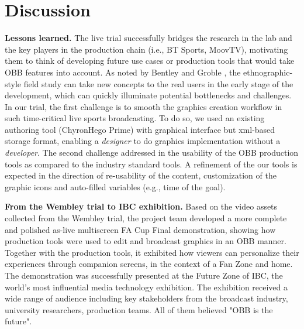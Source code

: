 \documentclass[sigchi-a, authorversion]{acmart}
\begin{document}
\section{Discussion}

\textbf{Lessons learned.} The live trial successfully bridges the research in
the lab and the key players in the production chain (i.e., BT Sports, MoovTV),
motivating them to think of developing future use cases or production tools that
would take OBB features into account. As noted by Bentley and Groble \cite{bentley2009},
the ethnographic-style field study can take new concepts to the real users in
the early stage of the development, which can quickly illuminate potential
bottlenecks and challenges. In our trial, the first challenge is to smooth the
graphics creation workflow in such time-critical live sports broadcasting. To
do so, we used an existing authoring tool (ChyronHego Prime) with graphical
interface but xml-based storage format, enabling a \textit{designer} to do
graphics implementation without a \textit{developer}. The second challenge
addressed in the usability of the OBB production tools as compared to the
industry standard tools. A refinement of the our tools is expected in the
direction of re-usability of the content, customization of the graphic icons and
auto-filled variables (e.g., time of the goal).

\textbf{From the Wembley trial to IBC exhibition.} Based on the video assets
collected from the Wembley trial, the project team developed a more complete and
polished as-live multiscreen FA Cup Final demonstration, showing how production
tools were used to edit and broadcast graphics in an OBB manner. Together with
the production tools, it exhibited how viewers can personalize their experiences
through companion screens, in the context of a Fan Zone and home. The
demonstration was successfully presented at the Future Zone of IBC, the world's
most influential media technology exhibition. The exhibition received a wide
range of audience including key stakeholders from the broadcast industry,
university researchers, production teams. All of them believed "OBB is the future".
\end{document}

